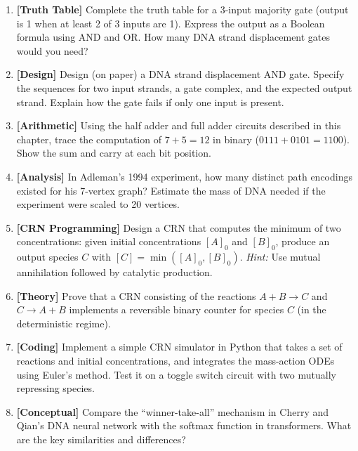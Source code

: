 \begin{enumerate}[label=\textbf{2.\arabic*.}, leftmargin=2.5em]

\item \textbf{[Truth Table]} Complete the truth table for a 3-input majority gate (output is 1 when at least 2 of 3 inputs are 1). Express the output as a Boolean formula using AND and OR. How many DNA strand displacement gates would you need?

\item \textbf{[Design]} Design (on paper) a DNA strand displacement AND gate. Specify the sequences for two input strands, a gate complex, and the expected output strand. Explain how the gate fails if only one input is present.

\item \textbf{[Arithmetic]} Using the half adder and full adder circuits described in this chapter, trace the computation of $7 + 5 = 12$ in binary ($0111 + 0101 = 1100$). Show the sum and carry at each bit position.

\item \textbf{[Analysis]} In Adleman's 1994 experiment, how many distinct path encodings existed for his 7-vertex graph? Estimate the mass of DNA needed if the experiment were scaled to 20 vertices.

\item \textbf{[CRN Programming]} Design a CRN that computes the minimum of two concentrations: given initial concentrations $[A]_0$ and $[B]_0$, produce an output species $C$ with $[C] = \min([A]_0, [B]_0)$. \textit{Hint:} Use mutual annihilation followed by catalytic production.

\item \textbf{[Theory]} Prove that a CRN consisting of the reactions $A + B \to C$ and $C \to A + B$ implements a reversible binary counter for species $C$ (in the deterministic regime).

\item \textbf{[Coding]} Implement a simple CRN simulator in Python that takes a set of reactions and initial concentrations, and integrates the mass-action ODEs using Euler's method. Test it on a toggle switch circuit with two mutually repressing species.

\item \textbf{[Conceptual]} Compare the ``winner-take-all'' mechanism in Cherry and Qian's DNA neural network with the softmax function in transformers. What are the key similarities and differences?


\end{enumerate}
